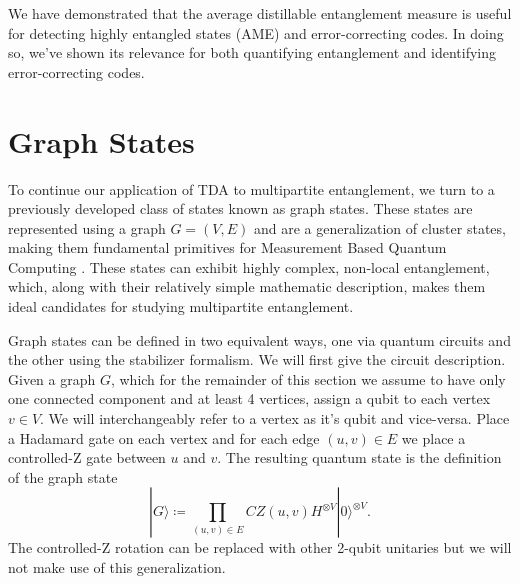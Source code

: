 \documentclass{article}
\newcommand{\ket}[1]{|#1\rangle}
\begin{document}
We have demonstrated that the average distillable entanglement measure is useful for detecting highly entangled states (AME) and error-correcting codes. In doing so, we've shown its relevance for both quantifying entanglement and identifying error-correcting codes.

\section{Graph States} \label{sec:graph_states}

To continue our application of TDA to multipartite entanglement, we turn to a previously developed class of states known as graph states. These states are represented using a graph $G = (V, E)$ and are a generalization of cluster states, making them fundamental primitives for Measurement Based Quantum Computing \cite{nielsen2006}. These states can exhibit highly complex, non-local entanglement, which, along with their relatively simple mathematic description, makes them ideal candidates for studying multipartite entanglement. 

Graph states can be defined in two equivalent ways, one via quantum circuits and the other using the stabilizer formalism. We will first give the circuit description. Given a graph $G$, which for the remainder of this section we assume to have only one connected component and at least 4 vertices, assign a qubit to each vertex $v \in V$. We will interchangeably refer to a vertex as it's qubit and vice-versa. Place a Hadamard gate on each vertex and for each edge $(u, v) \in E$ we place a controlled-Z gate between $u$ and $v$. The resulting quantum state is the definition of the graph state
\begin{equation}
    \ket{G} \coloneqq \prod_{(u, v) \in E} CZ(u, v) H^{\otimes V} \ket{0}^{\otimes V}. \label{def:graph_state}
\end{equation}
The controlled-Z rotation can be replaced with other 2-qubit unitaries but we will not make use of this generalization.
\end{document}
